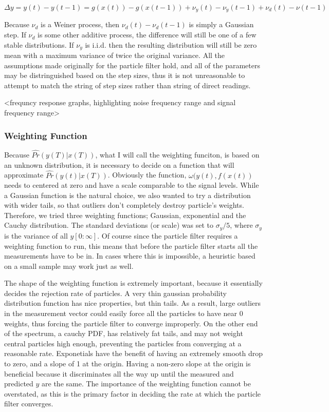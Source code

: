 \documentclass{article}
\begin{document}
\begin{equation}
\label{measass}
\Delta y = y(t) - y(t-1) = g(x(t)) - g(x(t-1)) + \nu_y(t) - \nu_y(t-1) + \nu_d(t) - \nu(t-1)
\end{equation}

Because $\nu_d$ is a Weiner process, then $\nu_d(t) - \nu_d(t-1)$ is simply a Gaussian step. If
$\nu_d$ is some other additive process, the difference will still be one of a few stable
distributions. If $\nu_y$ is i.i.d. then the resulting distribution will still be zero mean
with a maximum variance of twice the original variance. All the assumptions made originally
for the particle filter hold, and all of the parameters may be distringuished based on
the step sizes, thus it is not unreasonable to attempt to match the string of step sizes
rather than string of direct readings. 

<frequncy response graphs, highlighting noise frequency range and signal frequency range>

\subsubsection{Weighting Function}
Because $\hat{Pr}(y(T) | x(T))$, what I will call the weighting funciton,
is based on an unknown distribution, it is necessary to decide on a function
that will approximate $\hat{Pr}(y(t) | x(T))$. Obviously the function, $\omega(y(t), f(x(t))$
needs to centered at zero and have a scale comparable to the signal levels.
While a Gaussian function is the natural choice, we also wanted to try a distribution
with wider tails, so that outliers don't completely destroy particle's weights.
Therefore, we tried three weighting functions; Gaussian, exponential and 
the Cauchy distribution. The standard deviations (or scale) was set to 
$\sigma_y/5$, where $\sigma_y$ is the variance of all $y[0:\infty]$. Of course 
since the particle filter requires a weighting function to run, this means that
before the particle filter starts all the measurements have to be in. In cases where
this is impossible, a heuristic based on a small sample may work just as well.

The shape of the weighting function is extremely important, because it essentially decides
the rejection rate of particles. A very thin gaussian probability 
distribution function has nice properties, but thin tails. As a result, large
outliers in the measurement vector could easily force all the particles to
have near 0 weights, thus forcing the particle filter to converge improperly. 
On the other end of the spectrum, a cauchy PDF, has relatively fat tails, and
may not weight central particles high enough, preventing the particles from 
converging at a reasonable rate. Exponetials have the benefit of having an 
extremely smooth drop to zero, and a slope of 1 at the origin. Having a non-zero
slope at the origin is beneficial because it discriminates all the way up until
the measured and predicted $y$ are the same. The importance of the weighting function
cannot be overstated, as this is the primary factor in deciding the rate at
which the particle filter converges. 
\end{document}
